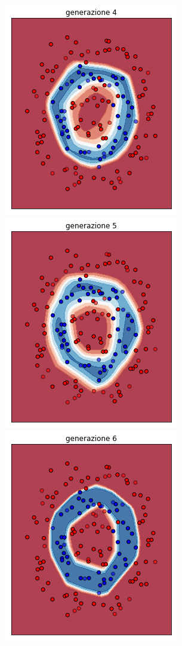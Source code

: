 \documentclass[12pt,a4paper]{report}
\begin{document}
\begin{figure}[H]
 \includegraphics[scale = 0.37]{images/circle+-rnd-log./4}
 \\
 \includegraphics[scale = 0.37]{images/circle+-rnd-log./5}
 \includegraphics[scale = 0.37]{images/circle+-rnd-log./6}

\end{figure}
\end{document}
